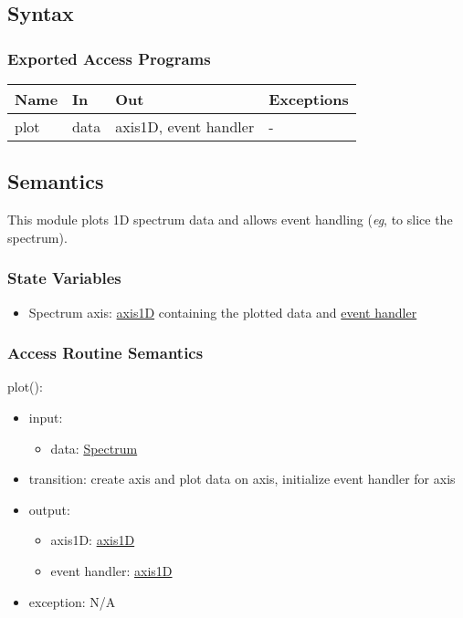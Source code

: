 \documentclass[12pt, titlepage]{article}
\begin{document}
\subsection{Syntax}

\subsubsection{Exported Access Programs}

\begin{center}
    \begin{tabular}{p{2cm} p{4cm} p{4cm} p{2cm}}
        \hline
        \textbf{Name} & \textbf{In} & \textbf{Out} & \textbf{Exceptions} \\
        \hline
        plot & data & axis1D, event handler & - \\
        \hline
    \end{tabular}
\end{center}

\subsection{Semantics}
This module plots 1D spectrum data and allows event handling (\textit{eg}, to
slice the spectrum).

\subsubsection{State Variables}
\begin{itemize}
    \item Spectrum axis: \hyperref[Mod:Plotting]{axis1D} containing the plotted
    data and \hyperref[Mod:Plotting]{event handler}
\end{itemize}

\subsubsection{Access Routine Semantics}

\noindent plot():
\begin{itemize}
    \item input:
    \begin{itemize}
        \item data: \hyperref[Mod:Spectrum]{Spectrum}
    \end{itemize}
    \item transition: create axis and plot data on axis, initialize event
    handler for axis
    \item output:
    \begin{itemize}
        \item axis1D: \hyperref[Mod:Plotting]{axis1D}
        \item event handler: \hyperref[Mod:Plotting]{axis1D}
    \end{itemize}
    \item exception: N/A
\end{itemize}
\end{document}
